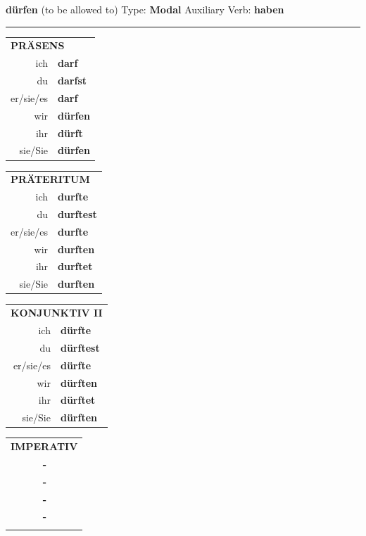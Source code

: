 \documentclass[10pt,a4paper]{revtex4-2}
\begin{document}
\begin{verbbox-modal}
    {\Large \bf dürfen} (to be allowed to) \hfill Type: \textbf{Modal} \hfill Auxiliary Verb: \textbf{haben} 
     \vspace{5pt}
    \hrule
    \vspace{5pt}
  \begin{tabular}{rl}
     \multicolumn{2}{l}{\textbf{PRÄSENS} }\\
    ich & \textbf{darf}\\
    du & \textbf{darfst}\\
    er/sie/es & \textbf{darf}\\
    wir & \textbf{dürfen}\\
    ihr & \textbf{dürft}\\
    sie/Sie & \textbf{dürfen}\\
  \end{tabular}
  \hfill
     \begin{tabular}{rl}
    \multicolumn{2}{l}{\textbf{PRÄTERITUM} }\\
    ich & \textbf{durfte}\\
    du & \textbf{durftest}\\
    er/sie/es & \textbf{durfte}\\
    wir & \textbf{durften}\\
    ihr & \textbf{durftet}\\
    sie/Sie & \textbf{durften}\\
  \end{tabular}
   \hfill
     \begin{tabular}{rl}
    \multicolumn{2}{l}{\textbf{KONJUNKTIV II} }\\
    ich & \textbf{dürfte}\\
    du & \textbf{dürftest}\\
    er/sie/es & \textbf{dürfte}\\
    wir & \textbf{dürften}\\
    ihr & \textbf{dürftet}\\
    sie/Sie & \textbf{dürften}\\
  \end{tabular}
  \hfill
  \begin{tabular}{rl}
     \multicolumn{2}{l}{\textbf{IMPERATIV} }\\
   & \textbf{-}\\
   & \textbf{-}\\
   & \textbf{-}\\
   & \textbf{-}\\
   & \vspace{10pt}
  \end{tabular}


\end{verbbox-modal}
\end{document}
